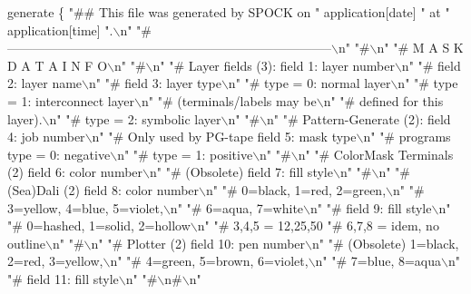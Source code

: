     generate \{
        "## This file was generated by SPOCK on " application[date]
        " at " application[time] ".\(\backslash\)n"
        "#-----------------------------------------------------------------------------\(\backslash\)n"
        "#\(\backslash\)n"
        "#                       M A S K D A T A   I N F O\(\backslash\)n"
        "#\(\backslash\)n"
        "#       Layer fields (3):       field  1: layer number\(\backslash\)n"
        "#                               field  2: layer name\(\backslash\)n"
        "#                               field  3: layer type\(\backslash\)n"
        "#                                         type = 0: normal layer\(\backslash\)n"
        "#                                         type = 1: interconnect layer\(\backslash\)n"
        "#                                                   (terminals/labels may be\(\backslash\)n"
        "#                                                    defined for this layer).\(\backslash\)n"
        "#                                         type = 2: symbolic layer\(\backslash\)n"
        "#\(\backslash\)n"
        "#       Pattern-Generate (2):   field  4: job number\(\backslash\)n"
        "#       Only used by PG-tape    field  5: mask type\(\backslash\)n"
        "#       programs                          type = 0: negative\(\backslash\)n"
        "#                                         type = 1: positive\(\backslash\)n"
        "#\(\backslash\)n"
        "#       ColorMask Terminals (2) field  6: color number\(\backslash\)n"
        "#       (Obsolete)              field  7: fill style\(\backslash\)n"
        "#\(\backslash\)n"
        "#       (Sea)Dali (2)           field  8: color number\(\backslash\)n"
        "#                                         0=black, 1=red, 2=green,\(\backslash\)n"
        "#                                         3=yellow, 4=blue, 5=violet,\(\backslash\)n"
        "#                                         6=aqua, 7=white\(\backslash\)n"
        "#                               field  9: fill style\(\backslash\)n"
        "#                                         0=hashed, 1=solid, 2=hollow\(\backslash\)n"
        "#                                         3,4,5 = 12,25,50%
        "#                                         6,7,8 = idem, no outline\(\backslash\)n"
        "#\(\backslash\)n"
        "#       Plotter (2)             field 10: pen number\(\backslash\)n"
        "#       (Obsolete)                        1=black, 2=red, 3=yellow,\(\backslash\)n"
        "#                                         4=green, 5=brown, 6=violet,\(\backslash\)n"
        "#                                         7=blue, 8=aqua\(\backslash\)n"
        "#                               field 11: fill style\(\backslash\)n"
        "#\(\backslash\)n#\(\backslash\)n"

